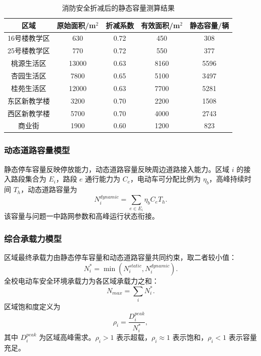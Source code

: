 \documentclass[UTF8,zihao=-4,a4paper]{ctexart}
\numberwithin{table}{section}
\numberwithin{figure}{section}
\numberwithin{equation}{section}
\begin{document}
\begin{table}[H]
\footnotesize
\centering
\caption{消防安全折减后的静态容量测算结果}
\label{tab:static_capacity}
\begin{tabular}{ccccc}
\toprule
\textbf{区域} & \textbf{原始面积/m$^2$} & \textbf{折减系数} & \textbf{有效面积/m$^2$} & \textbf{静态容量/辆} \\
\midrule
16号楼教学区 & 630 & 0.72 & 450 & 308 \\
25号楼教学区 & 770 & 0.72 & 550 & 377 \\
桃源生活区 & 13000 & 0.63 & 8160 & 5596 \\
杏园生活区 & 7800 & 0.65 & 5100 & 3497 \\
桂苑生活区 & 12000 & 0.63 & 7700 & 5281 \\
东区新教学楼 & 3200 & 0.70 & 2200 & 1508 \\
西区新教学楼 & 5700 & 0.70 & 4000 & 2743 \\
商业街 & 1900 & 0.60 & 1200 & 823 \\
\bottomrule
\end{tabular}
\end{table}

\subsubsection{动态道路容量模型}

静态停车容量反映停放能力，动态道路容量反映周边道路接入能力。区域 $i$ 的接入路段集合为 $E_i$，路段 $e$ 通行能力为 $C_e$，电动车可分配比例为 $\eta_b$，高峰持续时间 $T_h$，动态道路容量为
\begin{equation}
N_i^{dynamic}=\sum_{e\in E_i}\eta_b C_e T_h.
\end{equation}
该容量与问题一中路网参数和高峰运行状态衔接。

\subsubsection{综合承载力模型}

区域最终承载力由静态停车容量和动态道路容量共同约束，取二者较小值：
\begin{equation}
N_i^*=\min\left(N_i^{static},N_i^{dynamic}\right).
\end{equation}
全校电动车安全环境承载力为各区域承载力之和：
\begin{equation}
N_{max}=\sum_i N_i^*.
\end{equation}
区域饱和度定义为
\begin{equation}
\rho_i=\frac{D_i^{peak}}{N_i^*},
\end{equation}
其中 $D_i^{peak}$ 为区域高峰需求。$\rho_i>1$ 表示超载，$\rho_i\approx1$ 表示饱和，$\rho_i<1$ 表示容量充足。
\end{document}
